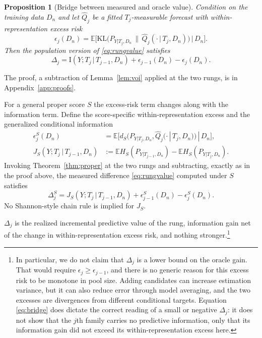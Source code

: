 \documentclass[11pt]{article}
\newtheorem{proposition}[theorem]{Proposition}
\theoremstyle{remark}
\newcommand{\E}{\mathbb{E}}
\newcommand{\KL}{\mathrm{KL}}
\newcommand{\I}{\mathrm{I}}
\newcommand{\given}{\,|\,}
\newcommand{\Dn}{D_n}
\begin{document}
\begin{proposition}[Bridge between measured and oracle value]\label{cor:bridge}
Condition on the training data $\Dn$ and let $\widehat Q_j$ be a fitted $T_j$-measurable
forecast with within-representation excess risk
\[
\epsilon_j(\Dn)=\E\big[\KL\big(P_{Y|T_j,\Dn}\,\|\,\widehat Q_j(\cdot\given
T_j,\Dn)\big)\,\big|\,\Dn\big].
\]
Then the population version of \eqref{eq:rungvalue} satisfies
\begin{equation}\label{eq:bridge}
\Delta_j=\I(Y;T_j\given T_{j-1},\Dn)+\epsilon_{j-1}(\Dn)-\epsilon_j(\Dn).
\end{equation}
\end{proposition}

The proof, a subtraction of Lemma~\ref{lem:voi} applied at the two rungs, is in
Appendix~\ref{app:proofs}.

For a general proper score $S$ the excess-risk term changes along with the information term.
Define the score-specific within-representation excess and the generalized conditional
information
\begin{align*}
\epsilon^S_j(\Dn)&=\E\big[d_S\big(P_{Y|T_j,\Dn},\widehat Q_j(\cdot\given
T_j,\Dn)\big)\given\Dn\big],\\
J_S(Y;T_j\given T_{j-1},\Dn)&:=\E H_S(P_{Y|T_{j-1},\Dn})-\E H_S(P_{Y|T_j,\Dn}).
\end{align*}
Invoking Theorem~\ref{thm:proper} at the two rungs and subtracting, exactly as in the proof
above, the measured difference \eqref{eq:rungvalue} computed under $S$ satisfies
\[
\Delta^S_j=J_S(Y;T_j\given T_{j-1},\Dn)+\epsilon^S_{j-1}(\Dn)-\epsilon^S_j(\Dn).
\]
No Shannon-style chain rule is implied for $J_S$.

$\Delta_j$ is the realized incremental predictive value of the rung, information gain net of
the change in within-representation excess risk, and nothing stronger.\footnote{In
particular, we do not claim that $\Delta_j$ is a lower bound on the oracle gain. That would
require $\epsilon_j\ge\epsilon_{j-1}$, and there is no generic reason for this excess risk
to be monotone in pool size. Adding candidates can increase estimation variance, but it can
also reduce error through model averaging, and the two excesses are divergences from
different conditional targets. Equation \eqref{eq:bridge} does dictate the correct reading
of a small or negative $\Delta_j$: it does not show that the $j$th family carries no
predictive information, only that its information gain did not exceed its
within-representation excess here.}
\end{document}
